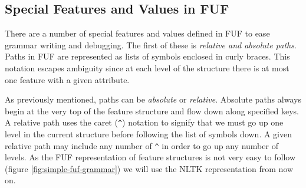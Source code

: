 \documentclass[12pt]{article}
\begin{document}
\subsection{Special Features and Values in FUF}
\label{sec:special-fuf-features-values}

There are a number of special features and values defined in FUF to ease grammar writing and
debugging. The first of these is \textit{relative and absolute paths}.
Paths in FUF are represented as lists of symbols enclosed in curly braces. This notation
escapes ambiguity since at each level of the structure there is at most one feature with
a given attribute.

As previously mentioned, paths can be \textit{absolute} or \textit{relative}. Absolute paths
always begin at the very top of the feature structure and flow down along specified keys.
A relative path uses the caret (\texttt{\^}) notation to signify that we must go up one level in 
the current structure before following the list of symbols
down. A given relative path may include any number of \texttt{\^} in order to go up any number of levels. 
As the FUF representation of feature structures is not very easy to follow (figure \ref{fig:simple-fuf-grammar}) 
we will use the NLTK
representation from now on.
\end{document}
